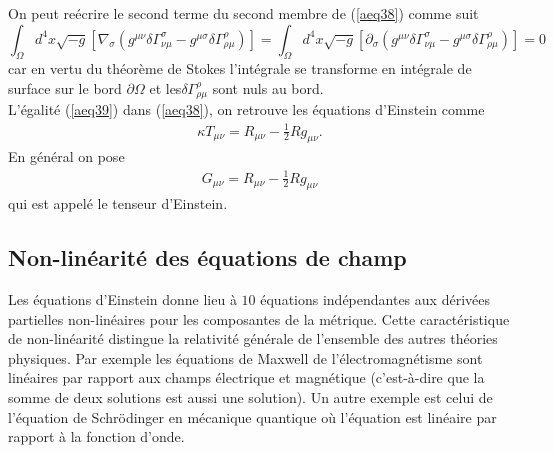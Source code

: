 \documentclass[a4paper,12pt]{report}
\theoremstyle{plain}
\theoremstyle{plain}
\begin{document}
  On peut re\'ecrire le second terme du second membre de (\ref{aeq38}) comme suit
\begin{equation}
 \int_{\Omega}d^{4}x \sqrt{-g}[\nabla_\sigma \left( g^{\mu\nu} \delta\Gamma^\sigma_{\nu\mu}-g^{\mu\sigma}\delta\Gamma^\rho_{\rho\mu} \right)]= 
\int_{\Omega}d^{4}x \sqrt{-g}[\partial_\sigma \left( g^{\mu\nu} \delta\Gamma^\sigma_{\nu\mu}-g^{\mu\sigma}\delta\Gamma^\rho_{\rho\mu} \right)]=0 \label{aeq39}
\end{equation}
car en vertu du th\'eor\`eme de Stokes l'int\'egrale se transforme en int\'egrale de surface sur le bord $\partial\Omega$ \quad et
 \quad les\quad $\delta\Gamma^\rho_{\rho\mu}$ sont nuls au bord.  \\
 L'\'egalit\'e (\ref{aeq39}) dans  (\ref{aeq38}),  on retrouve les \'equations d'Einstein comme
 \begin{eqnarray}
 \kappa T_{\mu\nu}= R_{\mu\nu}- \frac{1}{2} R g_{\mu\nu}.    
 \end{eqnarray}
En g\'en\'eral on pose
\begin{eqnarray}
 G_{\mu\nu}=  R_{\mu\nu}- \frac{1}{2} R g_{\mu\nu} \label{aeinstein1}
\end{eqnarray}
qui est appel\'e le tenseur d'Einstein.   


\subsection{Non-lin\'earit\'e des \'equations de champ}
Les \'equations d'Einstein donne lieu \`a $10$ \'equations ind\'ependantes aux d\'eriv\'ees partielles non-lin\'eaires
pour les composantes de la m\'etrique.   
Cette caract\'eristique de non-lin\'earit\'e distingue la relativit\'e g\'en\'erale de l'ensemble des autres th\'eories
physiques.   Par exemple 
les \'equations de
 Maxwell de l'\'electromagn\'etisme sont lin\'eaires par rapport aux champs \'electrique et magn\'etique 
(c'est-\`a-dire que la somme de deux solutions est aussi une
 solution).   Un autre exemple est celui de l'\'equation de Schr\"{o}dinger en m\'ecanique quantique o\`u l'\'equation est 
 lin\'eaire par rapport 
\`a la fonction d'onde.  
\end{document}
